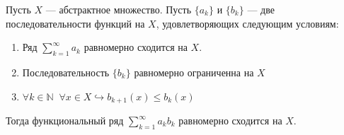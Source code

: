 \documentclass[11pt]{article}
\begin{document}
\begin{theorem}
    Пусть $X$ --- абстрактное множество. Пусть $\{a_k\}$ и $\{b_k\}$ --- две последовательности функций на $X$, удовлетворяющих следующим условиям:
    \begin{enumerate}
        \item Ряд $\displaystyle \sum_{k = 1}^{\infty} a_k$ равномерно сходится на $X$.
        \item Последовательность $\{b_k\}$ равномерно ограниченна на $X$
        \item $\forall k \in \mathbb{N} \; \; \forall x \in X \hookrightarrow b_{k + 1} (x) \leq b_k (x)$
    \end{enumerate}
    Тогда функциональный ряд $\displaystyle \sum_{k = 1}^{\infty} a_k b_k$ равномерно сходится на $X$.
\end{theorem}
\end{document}
